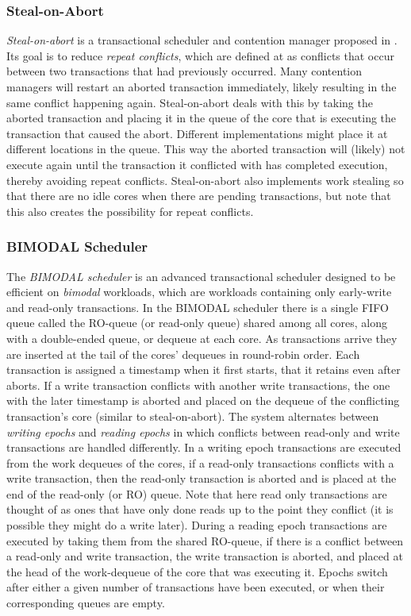 \subsubsection{Steal-on-Abort}
\emph{Steal-on-abort} is a transactional scheduler and contention manager proposed in \cite{1505821}.  Its goal is to reduce \emph{repeat conflicts}, which are defined at as conflicts that occur between two transactions that had previously occurred.
Many contention managers will restart an aborted transaction immediately, likely resulting in the same conflict happening again.
Steal-on-abort deals with this by taking the aborted transaction and placing it in the queue of the core that is executing the transaction that caused the abort.
Different implementations might place it at different locations in the queue.
This way the aborted transaction will (likely) not execute again until the transaction it conflicted with has completed execution, thereby avoiding repeat conflicts.
Steal-on-abort also implements work stealing so that there are no idle cores when there are pending transactions, but note that this also creates the possibility for repeat conflicts.

\subsubsection{BIMODAL Scheduler}
The \emph{BIMODAL scheduler} \cite{1696831} is an advanced transactional scheduler designed to be efficient on \emph{bimodal} workloads, which are workloads containing only early-write and read-only transactions.
In the BIMODAL scheduler there is a single FIFO queue called the RO-queue (or read-only queue) shared among all cores, along with a double-ended queue, or dequeue at each core. 
As transactions arrive they are inserted at the tail of the cores' dequeues in round-robin order.
Each transaction is assigned a timestamp when it first starts, that it retains even after aborts.
If a write transaction conflicts with another write transactions, the one with the later timestamp is aborted and placed on the dequeue of the conflicting transaction's core (similar to  steal-on-abort).
The system alternates between \emph{writing epochs} and \emph{reading epochs} in which conflicts between read-only and write transactions are handled differently.
In a writing epoch transactions are executed from the work dequeues of the cores, if a read-only transactions conflicts with a write transaction, then the read-only transaction is aborted and is placed at the end of the read-only (or RO) queue.
Note that here read only transactions are thought of as ones that have only done reads up to the point they conflict (it is possible they might do a write later).
During a reading epoch transactions are executed by taking them from the shared RO-queue, if there is a conflict between a read-only and write transaction, the write transaction is aborted, and placed at the head of the work-dequeue of the core that was executing it.
Epochs switch after either a given number of transactions have been executed, or when their corresponding queues are empty.

